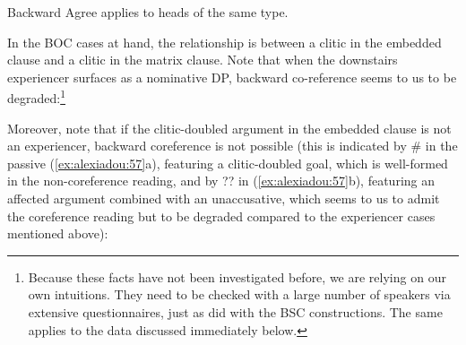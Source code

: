 \documentclass[output=paper]{langsci/langscibook}
\begin{document}
\ea%
    \label{ex:alexiadou:55}
    Backward Agree applies to heads of the same type. 
\z

In the BOC cases at hand, the relationship is between a clitic in the embedded clause and a clitic in the matrix clause. Note that when the downstairs experiencer surfaces as a nominative DP, backward co-reference seems to us to be degraded:\footnote{Because these facts have not been investigated before, we are relying on our own intuitions. They need to be checked with a large number of speakers via extensive questionnaires, just as \citet{Tsakali2017} did with the BSC constructions. The same applies to the data discussed immediately below.} 

    \z

Moreover, note that if the clitic-doubled argument in the embedded clause is not an experiencer, backward coreference is not possible (this is indicated by \# in the passive (\ref{ex:alexiadou:57}a), featuring a clitic-doubled goal, which is well-formed in the non-coreference reading, and by ?? in (\ref{ex:alexiadou:57}b), featuring an affected argument combined with an unaccusative, which seems to us to admit the coreference reading but to be degraded compared to the experiencer cases mentioned above):

\ea%
    \label{ex:alexiadou:57}
    \z
\z    
\end{document}
